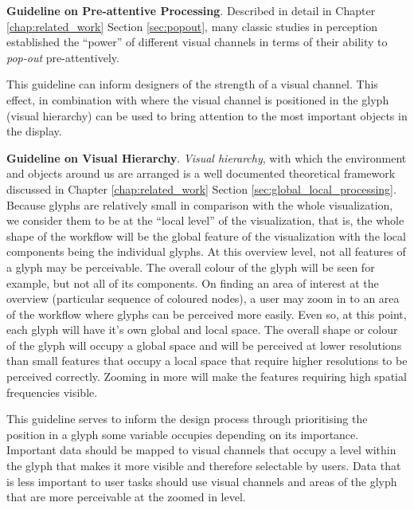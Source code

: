\textbf{Guideline on Pre-attentive Processing}.
Described in detail in Chapter \ref{chap:related_work} Section \ref{sec:popout}, many classic studies in perception established the ``power'' of different visual channels in terms of their ability to \emph{pop-out} pre-attentively.

This guideline can inform designers of the strength of a visual channel.
This effect, in combination with where the visual channel is positioned in the glyph (visual hierarchy) can be used to bring attention to the most important objects in the display. 


\textbf{Guideline on Visual Hierarchy}.
%
\emph{Visual hierarchy}, with which the environment and objects around us are arranged is a well documented theoretical framework discussed in Chapter \ref{chap:related_work} Section \ref{sec:global_local_processing}.
Because glyphs are relatively small in comparison with the whole visualization, we consider them to be at the ``local level'' of the visualization, that is, the whole shape of the workflow will be the global feature of the visualization with the local components being the individual glyphs. 
At this overview level, not all features of a glyph may be perceivable.
The overall colour of the glyph will be seen for example, but not all of its components.
On finding an area of interest at the overview (\eg particular sequence of coloured nodes), a user may zoom in to an area of the workflow where glyphs can be perceived more easily. 
Even so, at this point, each glyph will have it's own global and local space. 
The overall shape or colour of the glyph will occupy a global space and will be perceived at lower resolutions than small features that occupy a local space that require higher resolutions to be perceived correctly.
Zooming in more will make the features requiring high spatial frequencies visible.

This guideline serves to inform the design process through prioritising the position in a glyph some variable occupies depending on its importance.
Important data should be mapped to visual channels that occupy a level within the glyph that makes it more visible and therefore selectable by users. 
Data that is less important to user tasks should use visual channels and areas of the glyph that are more perceivable at the zoomed in level.


